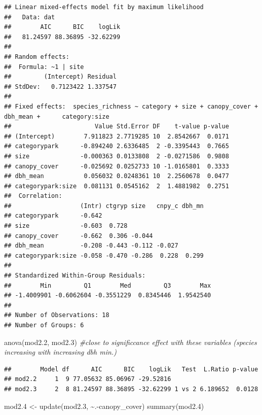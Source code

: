 \documentclass[
]{article}
\newenvironment{Shaded}{\begin{snugshade}}{\end{snugshade}}
\newcommand{\CommentTok}[1]{\textcolor[rgb]{0.56,0.35,0.01}{\textit{#1}}}
\newcommand{\FloatTok}[1]{\textcolor[rgb]{0.00,0.00,0.81}{#1}}
\newcommand{\FunctionTok}[1]{\textcolor[rgb]{0.00,0.00,0.00}{#1}}
\newcommand{\NormalTok}[1]{#1}
\newcommand{\OtherTok}[1]{\textcolor[rgb]{0.56,0.35,0.01}{#1}}
\newcommand{\SpecialCharTok}[1]{\textcolor[rgb]{0.00,0.00,0.00}{#1}}
\begin{document}
\begin{verbatim}
## Linear mixed-effects model fit by maximum likelihood
##   Data: dat 
##        AIC      BIC    logLik
##   81.24597 88.36895 -32.62299
## 
## Random effects:
##  Formula: ~1 | site
##         (Intercept) Residual
## StdDev:   0.7123422 1.337547
## 
## Fixed effects:  species_richness ~ category + size + canopy_cover + dbh_mean +      category:size 
##                       Value Std.Error DF    t-value p-value
## (Intercept)        7.911823 2.7719285 10  2.8542667  0.0171
## categorypark      -0.894240 2.6336485  2 -0.3395443  0.7665
## size              -0.000363 0.0133808  2 -0.0271586  0.9808
## canopy_cover      -0.025692 0.0252733 10 -1.0165801  0.3333
## dbh_mean           0.056032 0.0248361 10  2.2560678  0.0477
## categorypark:size  0.081131 0.0545162  2  1.4881982  0.2751
##  Correlation: 
##                   (Intr) ctgryp size   cnpy_c dbh_mn
## categorypark      -0.642                            
## size              -0.603  0.728                     
## canopy_cover      -0.662  0.306 -0.044              
## dbh_mean          -0.208 -0.443 -0.112 -0.027       
## categorypark:size -0.058 -0.470 -0.286  0.228  0.299
## 
## Standardized Within-Group Residuals:
##        Min         Q1        Med         Q3        Max 
## -1.4009901 -0.6062604 -0.3551229  0.8345446  1.9542540 
## 
## Number of Observations: 18
## Number of Groups: 6
\end{verbatim}

\begin{Shaded}
\begin{Highlighting}[]
\FunctionTok{anova}\NormalTok{(mod2}\FloatTok{.2}\NormalTok{, mod2}\FloatTok{.3}\NormalTok{) }\CommentTok{\#close to significcance effect with these variables (species increasing with increasing dbh min.) }
\end{Highlighting}
\end{Shaded}

\begin{verbatim}
##        Model df      AIC      BIC    logLik   Test  L.Ratio p-value
## mod2.2     1  9 77.05632 85.06967 -29.52816                        
## mod2.3     2  8 81.24597 88.36895 -32.62299 1 vs 2 6.189652  0.0128
\end{verbatim}

\begin{Shaded}
\begin{Highlighting}[]
\NormalTok{mod2}\FloatTok{.4} \OtherTok{\textless{}{-}} \FunctionTok{update}\NormalTok{(mod2}\FloatTok{.3}\NormalTok{, }\SpecialCharTok{\textasciitilde{}}\NormalTok{.}\SpecialCharTok{{-}}\NormalTok{canopy\_cover)}
\FunctionTok{summary}\NormalTok{(mod2}\FloatTok{.4}\NormalTok{)}
\end{Highlighting}
\end{Shaded}
\end{document}
